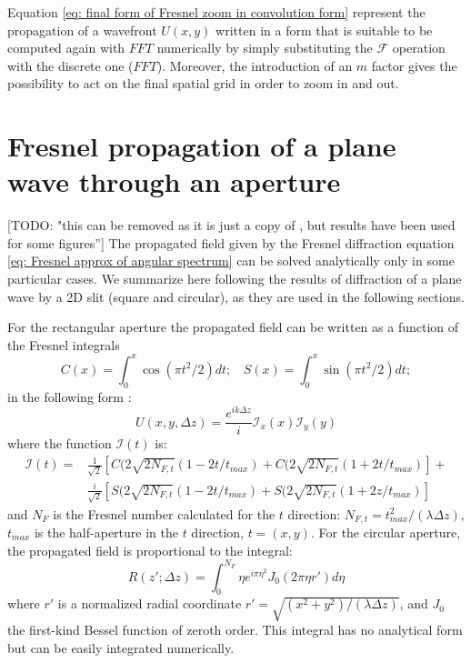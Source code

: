 \documentclass{iucr}              %
\newcommand{\todo}[1]{{\color{red}[TODO: "#1'']}}
\begin{document}
Equation \ref{eq: final form of Fresnel zoom in convolution form} represent the propagation of a wavefront $U(x,y)$ written in a form that is suitable to be computed again with $FFT$ numerically by simply substituting the $\mathcal{F}$ operation with the discrete one ($FFT$). Moreover, the introduction of an $m$ factor gives the possibility to act on the final spatial grid in order to zoom in and out.



\section{Fresnel propagation of a plane wave through an aperture}
\todo{this can be removed as it is just a copy of \cite{goodmanfourier}, but results have been used for some figures}
The propagated field given by the Fresnel diffraction equation \ref{eq: Fresnel approx of angular spectrum} can be solved analytically only in some particular cases. We summarize here following \cite{goodmanfourier} the results of diffraction of a plane wave by a 2D slit (square and circular), as they are used in the following sections. 

For the rectangular aperture the propagated field can be written as a function of the Fresnel integrals
\begin{equation}\label{eq: fresnel integrals}
C(x) = \int_0^x \cos(\pi t^2 / 2) dt;  ~~~~ S(x) = \int_0^x \sin(\pi t^2 / 2) dt;
\end{equation}
in the following form \cite{goodmanfourier}:
\begin{equation}\label{eq: analytical rectangular slit}
U(x, y, \Delta z)= \frac{e^{i k \Delta z}}{i} \mathcal{I}_x(x) \mathcal{I}_y(y)
\end{equation}
where the function $\mathcal{I}(t)$ is: 
\begin{align}\label{eq: analytical rectangular slit}
\mathcal{I}(t) = & \frac{1}{\sqrt 2}[ C(2 \sqrt{2 N_{F,t}} (1 - 2 t /t_{max}) + C(2 \sqrt{2 N_{F,t}} (1 + 2 t /t_{max})] +\\
		 & \frac{i}{\sqrt 2}[ S(2 \sqrt{2 N_{F,t}} (1 - 2 t /t_{max}) + S(2 \sqrt{2 N_{F,t}} (1 + 2 z /t_{max})]
\end{align}
and $N_F$ is the Fresnel number calculated for the $t$ direction: $N_{F,t} = t_{max}^2 / (\lambda \Delta z)$, $t_{max}$ is the half-aperture in the $t$ direction, $t=(x,y)$.
For the circular aperture, the propagated field is proportional to the integral:
\begin{equation}\label{eq: analytical rectangular slit}
R(z'; \Delta z) = \int_0^{N_F} \eta e^{i \pi \eta^2} J_0(2 \pi \eta r') d\eta 
\end{equation}
where $r'$ is a normalized radial coordinate $r' = \sqrt{(x^2 + y^2)/(\lambda \Delta z)}$, and $J_0$ the first-kind Bessel function of zeroth order. This integral has no analytical form but can be easily integrated numerically. 
\end{document}
